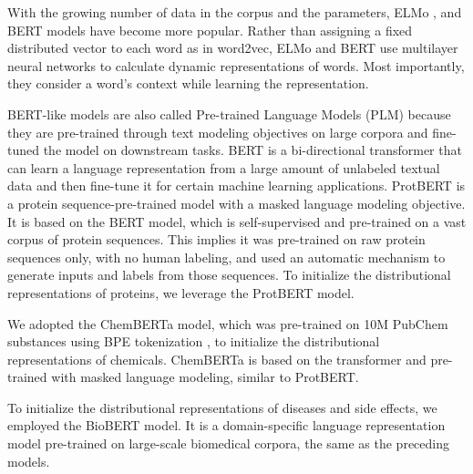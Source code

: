 With the growing number of data in the corpus and the parameters, ELMo \cite{devlin2018bert}, and BERT \cite{peters2018deep} models have become more popular. Rather than assigning a fixed distributed vector to each word as in word2vec, ELMo and BERT use multilayer neural networks to calculate dynamic representations of words. Most importantly, they consider a word's context while learning the representation. 

BERT-like models are also called Pre-trained Language Models (PLM) because they are pre-trained through text modeling objectives on large corpora and fine-tuned the model on downstream tasks. 
BERT is a bi-directional transformer that can learn a language representation from a large amount of unlabeled textual data and then fine-tune it for certain machine learning applications. ProtBERT \cite{prot_bert, Elnaggar2020.07.12.199554} is a protein sequence-pre-trained model with a masked language modeling objective. It is based on the BERT model, which is self-supervised and pre-trained on a vast corpus of protein sequences. This implies it was pre-trained on raw protein sequences only, with no human labeling, and used an automatic mechanism to generate inputs and labels from those sequences. To initialize the distributional representations of proteins, we leverage the ProtBERT model. 

We adopted the ChemBERTa \cite{chithrananda2020chemberta} model, which was pre-trained on 10M PubChem substances using BPE tokenization \cite{sennrich2015neural}, to initialize the distributional representations of chemicals. ChemBERTa is based on the transformer and pre-trained with masked language modeling, similar to ProtBERT.

To initialize the distributional representations of diseases and side effects, we employed the BioBERT \cite{lee2020biobert} model. It is a domain-specific language representation model pre-trained on large-scale biomedical corpora, the same as the preceding models.

